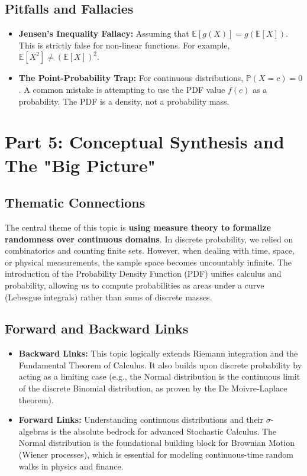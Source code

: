 \documentclass[11pt, a4paper]{article}
\theoremstyle{definition}
\theoremstyle{remark}
\newcommand{\E}{\mathbb{E}}
\newcommand{\Prob}{\mathbb{P}}
\begin{document}
\subsection{Pitfalls and Fallacies}
\begin{itemize}
    \item \textbf{Jensen's Inequality Fallacy:} Assuming that $\E[g(X)] = g(\E[X])$. This is strictly false for non-linear functions. For example, $\E[X^2] \neq (\E[X])^2$.
    \item \textbf{The Point-Probability Trap:} For continuous distributions, $\Prob(X = c) = 0$. A common mistake is attempting to use the PDF value $f(c)$ as a probability. The PDF is a density, not a probability mass.
\end{itemize}

\newpage
\section{Part 5: Conceptual Synthesis and The "Big Picture"}

\subsection{Thematic Connections}
The central theme of this topic is \textbf{using measure theory to formalize randomness over continuous domains}. In discrete probability, we relied on combinatorics and counting finite sets. However, when dealing with time, space, or physical measurements, the sample space becomes uncountably infinite. The introduction of the Probability Density Function (PDF) unifies calculus and probability, allowing us to compute probabilities as areas under a curve (Lebesgue integrals) rather than sums of discrete masses.

\subsection{Forward and Backward Links}
\begin{itemize}
    \item \textbf{Backward Links:} This topic logically extends Riemann integration and the Fundamental Theorem of Calculus. It also builds upon discrete probability by acting as a limiting case (e.g., the Normal distribution is the continuous limit of the discrete Binomial distribution, as proven by the De Moivre-Laplace theorem).
    \item \textbf{Forward Links:} Understanding continuous distributions and their $\sigma$-algebras is the absolute bedrock for advanced Stochastic Calculus. The Normal distribution is the foundational building block for Brownian Motion (Wiener processes), which is essential for modeling continuous-time random walks in physics and finance.
\end{itemize}
\end{document}
